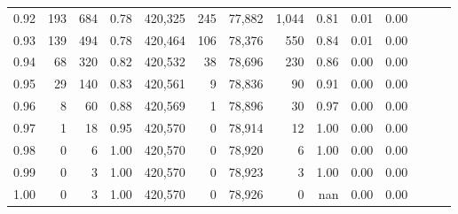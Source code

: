 \begin{tabular}{rrrrrrrrrrrrrr}
0.92 &    193 &    684 &  0.78 &  420,325 &      245 &  77,882 &   1,044 &  0.81 &  0.01 &      0.00 \\
0.93 &    139 &    494 &  0.78 &  420,464 &      106 &  78,376 &     550 &  0.84 &  0.01 &      0.00 \\
0.94 &     68 &    320 &  0.82 &  420,532 &       38 &  78,696 &     230 &  0.86 &  0.00 &      0.00 \\
0.95 &     29 &    140 &  0.83 &  420,561 &        9 &  78,836 &      90 &  0.91 &  0.00 &      0.00 \\
0.96 &      8 &     60 &  0.88 &  420,569 &        1 &  78,896 &      30 &  0.97 &  0.00 &      0.00 \\
0.97 &      1 &     18 &  0.95 &  420,570 &        0 &  78,914 &      12 &  1.00 &  0.00 &      0.00 \\
0.98 &      0 &      6 &  1.00 &  420,570 &        0 &  78,920 &       6 &  1.00 &  0.00 &      0.00 \\
0.99 &      0 &      3 &  1.00 &  420,570 &        0 &  78,923 &       3 &  1.00 &  0.00 &      0.00 \\
1.00 &      0 &      3 &  1.00 &  420,570 &        0 &  78,926 &       0 &   nan &  0.00 &      0.00 \\
\bottomrule
\end{tabular}
